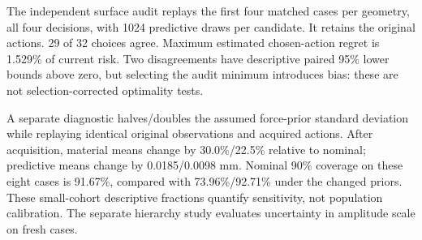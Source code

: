 The independent surface audit replays the first four matched cases per geometry, all four decisions, with 1024 predictive draws per candidate. It retains the original actions. 29 of 32 choices agree. Maximum estimated chosen-action regret is 1.529\% of current risk. Two disagreements have descriptive paired 95\% lower bounds above zero, but selecting the audit minimum introduces bias: these are not selection-corrected optimality tests.

A separate diagnostic halves/doubles the assumed force-prior standard deviation while replaying identical original observations and acquired actions. After acquisition, material means change by 30.0\%/22.5\% relative to nominal; predictive means change by 0.0185/0.0098 mm. Nominal 90\% coverage on these eight cases is 91.67\%, compared with 73.96\%/92.71\% under the changed priors. These small-cohort descriptive fractions quantify sensitivity, not population calibration. The separate hierarchy study evaluates uncertainty in amplitude scale on fresh cases.
